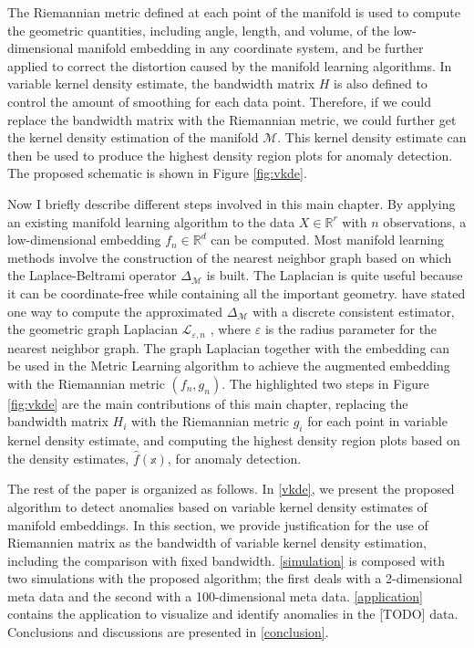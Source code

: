 \documentclass[11pt,a4paper,]{article}
\begin{document}
The Riemannian metric defined at each point of the manifold is used to compute the geometric quantities, including angle, length, and volume, of the low-dimensional manifold embedding in any coordinate system, and be further applied to correct the distortion caused by the manifold learning algorithms.
In variable kernel density estimate, the bandwidth matrix \(H\) is also defined to control the amount of smoothing for each data point.
Therefore, if we could replace the bandwidth matrix with the Riemannian metric, we could further get the kernel density estimation of the manifold \(\mathcal{M}\). This kernel density estimate can then be used to produce the highest density region plots \autocite{Hyndman1996-lk} for anomaly detection.
The proposed schematic is shown in Figure \ref{fig:vkde}.



Now I briefly describe different steps involved in this main chapter. By applying an existing manifold learning algorithm to the data \(X\in \mathbb{R}^r\) with \(n\) observations, a low-dimensional embedding \(f_n \in \mathbb{R}^d\) can be computed. Most manifold learning methods involve the construction of the nearest neighbor graph based on which the Laplace-Beltrami operator \(\Delta_\mathcal{M}\) is built. The Laplacian is quite useful because it can be coordinate-free while containing all the important geometry. \textcite{Perrault-Joncas2013-pq} have stated one way to compute the approximated \(\Delta_\mathcal{M}\) with a discrete consistent estimator, the geometric graph Laplacian \(\mathcal{L}_{\varepsilon,n}\) \autocite{Zhou2011-za}, where \(\varepsilon\) is the radius parameter for the nearest neighbor graph. The graph Laplacian together with the embedding can be used in the Metric Learning algorithm to achieve the augmented embedding with the Riemannian metric \((f_n, g_n)\). The highlighted two steps in Figure \ref{fig:vkde} are the main contributions of this main chapter, replacing the bandwidth matrix \(H_i\) with the Riemannian metric \(g_i\) for each point in variable kernel density estimate, and computing the highest density region plots based on the density estimates, \(\hat{f}(\mathbb{x})\), for anomaly detection.

The rest of the paper is organized as follows.
In \autoref{vkde}, we present the proposed algorithm to detect anomalies based on variable kernel density estimates of manifold embeddings. In this section, we provide justification for the use of Riemannien matrix as the bandwidth of variable kernel density estimation, including the comparison with fixed bandwidth.
\autoref{simulation} is composed with two simulations with the proposed algorithm; the first deals with a 2-dimensional meta data and the second with a 100-dimensional meta data.
\autoref{application} contains the application to visualize and identify anomalies in the {[}TODO{]} data.
Conclusions and discussions are presented in \autoref{conclusion}.
\end{document}
